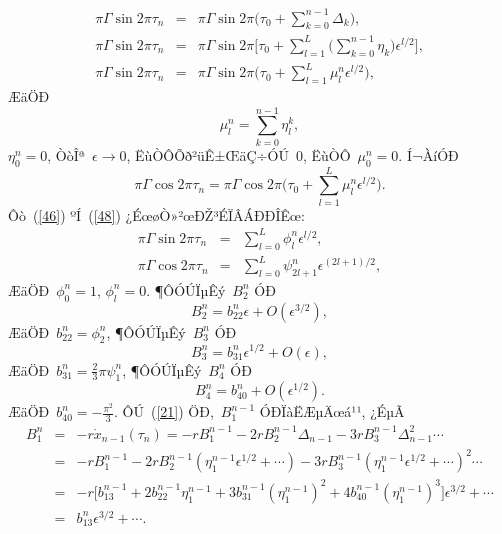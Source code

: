 \documentclass[12pt,openany,CJK,oneside]{cctbook}
\begin{document}
{\begin{eqnarray}
  \pi\Gamma\sin2\pi\tau_{n} &=& \pi\Gamma\sin2\pi\Big(\tau_{0}+\sum_{k=0}^{n-1}\Delta_{k}\Big), \\
  \pi\Gamma\sin2\pi\tau_{n} &=& \pi\Gamma\sin2\pi\Big[\tau_{0}+\sum_{l=1}^{L}\Big(\sum_{k=0}^{n-1}\eta_{k}\Big)\epsilon^{l/2}\Big], \\
  \pi\Gamma\sin2\pi\tau_{n} &=& \pi\Gamma\sin2\pi\Big(\tau_{0}+\sum_{l=1}^{L}\mu_{l}^{n}\epsilon^{l/2}\Big),\label{46}
\end{eqnarray}
ÆäÖÐ
\begin{equation}\label{47}
  \mu_{l}^{n}=\sum_{k=0}^{n-1}\eta_{l}^{k},
\end{equation}
$\eta_{0}^{n}=0$, ÒòÎª\ $\epsilon\rightarrow0$, ËùÒÔÕð²üÊ±ŒäÇ÷ÓÚ\ 0, ËùÒÔ\ $\mu_{0}^{n}=0$.
Í¬ÀíÓÐ
\begin{equation}\label{48}
  \pi\Gamma\cos2\pi\tau_{n}=\pi\Gamma\cos2\pi\Big(\tau_{0}+\sum_{l=1}^{L}\mu_{l}^{n}\epsilon^{l/2}\Big).
\end{equation}
Ôò\ (\ref{46}) ºÍ\ (\ref{48}) ¿ÉœøÒ»²œÐŽ³ÉÏÂÁÐÐÎÊœ:
\begin{eqnarray*}
 \pi\Gamma\sin2\pi\tau_{n} &=& \sum_{l=0}^{L}\phi_{l}^{n}\epsilon^{l/2},\\
  \pi\Gamma\cos2\pi\tau_{n} &=& \sum_{l=0}^{L}\psi_{2l+1}^{n}\epsilon^{(2l+1)/2},
\end{eqnarray*}
ÆäÖÐ\ $\phi_{0}^{n}=1$, $\phi_{l}^{n}=0$.
¶ÔÓÚÏµÊý\ $B_2^n$ ÓÐ
\begin{equation}\label{51}
  B_{2}^{n}=b_{22}^{n}\epsilon+O(\epsilon^{3/2}),
\end{equation}
ÆäÖÐ\ $b_{22}^{n}=\phi_{2}^{n}$, ¶ÔÓÚÏµÊý\ $B_3^n$ ÓÐ
\begin{equation}\label{52}
  B_{3}^{n}=b_{31}^{n}\epsilon^{1/2}+O(\epsilon),
\end{equation}
ÆäÖÐ\ $ b_{31}^{n}=\frac{2}{3}\pi\psi_{1}^{n}$, ¶ÔÓÚÏµÊý\ $B_4^n$ ÓÐ
\begin{equation}\label{53}
  B_{4}^{n}=b_{40}^{n}+O(\epsilon^{1/2}).
\end{equation}
ÆäÖÐ\ $b_{40}^{n}=-\frac{\pi^{2}}{3}$.
ÔÚ\ (\ref{21}) ÖÐ,\ $B_{1}^{n-1}$ ÓÐÏàËÆµÄœá¹¹, ¿ÉµÃ
\begin{eqnarray*}
   B_{1}^{n} &=&-r\dot{x}_{n-1}(\tau_n)=-rB_1^{n-1}-2rB_2^{n-1}\Delta_{n-1}-3rB_3^{n-1}\Delta_{n-1}^2\cdots\\
    &=& -rB_1^{n-1}-2rB_2^{n-1}(\eta_{1}^{n-1}\epsilon^{1/2}+\cdots)-3rB_3^{n-1}(\eta_{1}^{n-1}\epsilon^{1/2}+\cdots)^2\cdots\\
    &=& -r\Big[b_{13}^{n-1}+2b_{22}^{n-1}\eta_{1}^{n-1}+3b_{31}^{n-1}(\eta_{1}^{n-1})^{2}+4b_{40}^{n-1}(\eta_{1}^{n-1})^{3}\Big]\epsilon^{3/2}+\cdots\\
    &=& b_{13}^{n}\epsilon^{3/2}+\cdots.\label{57}
\end{eqnarray*}

}
\end{document}
